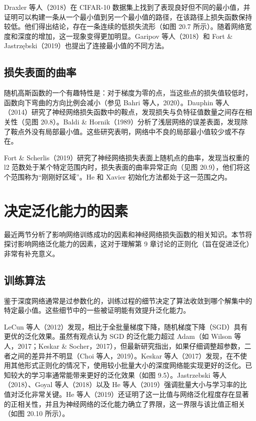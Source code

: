 Draxler 等人（2018）在 CIFAR-10 数据集上找到了表现良好但不同的最小值，并证明可以构建一条从一个最小值到另一个最小值的路径，在该路径上损失函数保持较低。他们得出结论，存在一条连续的低损失流形（如图 20.7 所示）。随着网络宽度和深度的增加，这一现象变得更加明显。Garipov 等人（2018）和 Fort \& Jastrzębski（2019）也提出了连接最小值的不同方法。

\subsection{损失表面的曲率}
随机高斯函数的一个有趣特性是：对于梯度为零的点，当这些点的损失值较低时，函数向下弯曲的方向比例会减小（参见 Bahri 等人，2020）。Dauphin 等人（2014）研究了神经网络损失函数中的鞍点，发现损失与负特征值数量之间存在相关性（见图 20.8）。Baldi \& Hornik（1989）分析了浅层网络的误差表面，发现除了鞍点外没有局部最小值。这些研究表明，网络中不良的局部最小值较少或不存在。

Fort \& Scherlis（2019）研究了神经网络损失表面上随机点的曲率，发现当权重的 l2 范数处于某个特定范围内时，损失表面的曲率异常正向（见图 20.9），他们将这个范围称为“刚刚好区域”。He 和 Xavier 初始化方法都处于这一范围之内。

\section{决定泛化能力的因素}
最近两节分析了影响网络训练成功的因素和神经网络损失函数的相关知识。本节将探讨影响网络泛化能力的因素，这对于理解第 9 章讨论的正则化（旨在促进泛化）非常有补充意义。

\subsection{训练算法}
鉴于深度网络通常是过参数化的，训练过程的细节决定了算法收敛到哪个解集中的特定最小值。这些细节中的一些被证明能有效提升泛化能力。

LeCun 等人（2012）发现，相比于全批量梯度下降，随机梯度下降（SGD）具有更优的泛化效果。虽然有观点认为 SGD 的泛化能力超过 Adam（如 Wilson 等人，2017；Keskar \& Socher，2017），但最新研究指出，如果仔细调整超参数，二者之间的差异并不明显（Choi 等人，2019）。Keskar 等人（2017）发现，在不使用其他形式正则化的情况下，使用较小批量大小的深度网络能实现更好的泛化。已知较大的学习率通常能带来更好的泛化效果（如图 9.5）。Jastrzebski 等人（2018）、Goyal 等人（2018）以及 He 等人（2019）强调批量大小与学习率的比值对泛化非常关键。He 等人（2019）还证明了这一比值与网络泛化程度存在显著的正相关性，并且为神经网络的泛化能力确立了界限，这一界限与该比值正相关（如图 20.10 所示）。

